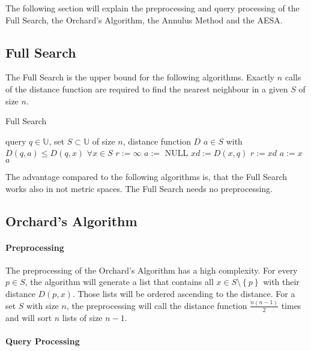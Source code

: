 \documentclass[runningheads,a4paper]{llncs}
\begin{document}
The following section will explain the preprocessing and query processing of the Full Search, the Orchard’s Algorithm,
the Annulus Method and the AESA.

\subsection{Full Search}

The Full Search is the upper bound for the following algorithms. Exactly $n$ calls of the distance function are required
to find the nearest neighbour in a given $S$ of size $n$.\\

\begin{algorithm}[H]
	\caption{Full Search}
	\label{fullsearch}
	\begin{algorithmic}
		\REQUIRE query $q \in \mathbb{U}$, set $S \subset \mathbb{U}$ of size $n$, distance function $D$
		\ENSURE $a \in S$ with $D(q, a) \le D(q, x)$ $\forall x \in S$
		\STATE $r := \infty$
		\STATE $a :=$ NULL
			\STATE $xd := D(x, q)$
				\STATE $r := xd$
				\STATE $a := x$
			\ENDIF
		\ENDFOR
		\RETURN $a$
	\end{algorithmic}
\end{algorithm}

The advantage compared to the following algorithms is, that the Full Search works also in not metric spaces. The Full
Search needs no preprocessing.

\subsection{Orchard’s Algorithm}

\paragraph{Preprocessing}

The preprocessing of the Orchard’s Algorithm has a high complexity. For every $p \in S$, the algorithm will generate a
list that contains all $x \in S\setminus\left\{ {p}\right\}$ with their distance $D(p, x)$. Those lists will be ordered
ascending to the distance. For a set $S$ with size $n$, the preprocessing will call the distance function
$\frac{n(n-1)}{2}$ times and will sort $n$ lists of size $n-1$.

\paragraph{Query Processing}
\end{document}
